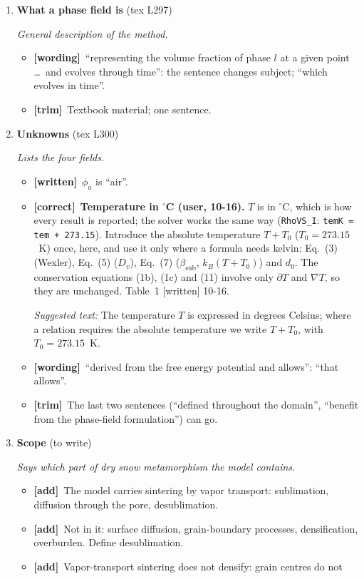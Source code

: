 \documentclass[11pt]{article}
\newcommand{\Have}{\textcolor{have}{\textbf{[written]}}\ }
\newcommand{\Pg}[3]{\item \textbf{#1} {\small(#2)}\par\textit{#3}}
\newcommand{\tC}{\textcolor{miss}{\textbf{[correct]}}\ }
\newcommand{\tG}{\textcolor{stale}{\textbf{[wording]}}\ }
\newcommand{\tT}{\textcolor{cut}{\textbf{[trim]}}\ }
\newcommand{\tA}{\textcolor{have}{\textbf{[add]}}\ }
\newcommand{\Snippet}[1]{\par\smallskip\noindent\colorbox{chk!8}{\parbox{0.96\linewidth}{\small\textit{Suggested text:} #1}}\par\smallskip}
\begin{document}
\begin{enumerate}
\subsection{Phase-Field Model of Dry Snow Metamorphism}
\Pg{What a phase field is}{tex L297}{General description of the method.}
  \begin{itemize}
  \item \tG ``representing the volume fraction of phase $l$ at a given point
    \ldots\ and evolves through time'': the sentence changes subject; ``which
    evolves in time''.
  \item \tT Textbook material; one sentence.
  \end{itemize}
\Pg{Unknowns}{tex L300}{Lists the four fields.}
  \begin{itemize}
  \item \Have $\phi_a$ is ``air''.
  \item \tC \textbf{Temperature in $^\circ$C (user, 10-16).} $T$ is in
    $^\circ$C, which is how every result is reported; the solver works the
    same way (\texttt{RhoVS\_I}: \texttt{temK = tem + 273.15}). Introduce the
    absolute temperature $T + T_0$ ($T_0 = 273.15$~K) once, here, and use it
    only where a formula needs kelvin: Eq.~(3) (Wexler), Eq.~(5) ($D_v$),
    Eq.~(7) ($\beta_{\mathrm{sub}}$, $k_B (T + T_0)$) and $d_0$. The
    conservation equations (1b), (1c) and (11) involve only $\partial T$ and
    $\nabla T$, so they are unchanged. Table~1 [written] 10-16.
  \Snippet{The temperature $T$ is expressed in degrees Celsius; where a
    relation requires the absolute temperature we write $T + T_0$, with $T_0 =
    273.15$~K.}
  \item \tG ``derived from the free energy potential and allows'': ``that
    allows''.
  \item \tT The last two sentences (``defined throughout the domain'',
    ``benefit from the phase-field formulation'') can go.
  \end{itemize}
\Pg{Scope}{to write}{Says which part of dry snow metamorphism the model contains.}
  \begin{itemize}
  \item \tA The model carries sintering by vapor transport: sublimation,
    diffusion through the pore, desublimation.
  \item \tA Not in it: surface diffusion, grain-boundary processes,
    densification, overburden. Define desublimation.
  \item \tA Vapor-transport sintering does not densify: grain centres do not

\end{itemize}
\end{enumerate}
\end{document}
